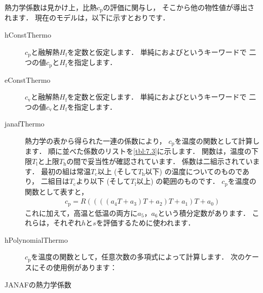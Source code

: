 熱力学係数は見かけ上，比熱$c_{\mathrm{p}}$の評価に関与し，
そこから他の物性値が導出されます．
現在のモデルは，以下に示すとおりです．
\begin{description}
 \item[hConstThermo]
            $c_{\mathrm{p}}$と融解熱$H_{\mathrm{f}}$を定数と仮定します．
            単純におよびというキーワードで
            二つの値$c_{\mathrm{p}}$と$H_{\mathrm{f}}$を指定します．
 \item[eConstThermo]
            $c_{\mathrm{v}}$と融解熱$H_{\mathrm{f}}$を定数と仮定します．
            単純におよびというキーワードで
            二つの値$c_{\mathrm{v}}$と$H_{\mathrm{f}}$を指定します．
 \item[janafThermo]
            熱力学の表から得られた一連の係数により，
            $c_{\mathrm{p}}$を温度の関数として計算します．
            順に並べた係数のリストを\autoref{tbl:7.3}に示します．
            関数は，温度の下限$T_{\mathrm{l}}$と上限$T_{\mathrm{h}}$の間で妥当性が確認されています．
            係数は二組示されています．
            最初の組は常温$T_{\mathrm{c}}$以上 (そして$T_{\mathrm{h}}$以下) の温度についてのものであり，
            二組目は$T_{\mathrm{c}}$より以下 (そして$T_{\mathrm{l}}$以上) の範囲のものです．
            $c_{\mathrm{p}}$を温度の関数として表すと，
\begin{align}
 \label{eq:7.1}
 c_{\mathrm{p}} = R((((a_{4}T + a_{3})T + a_{2})T + a_{1})T + a_{0})
\end{align}
            これに加えて，高温と低温の両方に$a_{5}$，$a_{6}$という積分定数があります．
            これらは，それぞれ$h$と$s$を評価するために使われます．
 \item[hPolynomialThermo]
            $c_{\mathrm{p}}$を温度の関数として，任意次数の多項式によって計算します．
            次のケースにその使用例があります：\\
            \hfil{}
\end{description}


\begin{table}[ht]
 
 \caption{JANAFの熱力学係数}
 \label{tbl:7.3}
\end{table}


